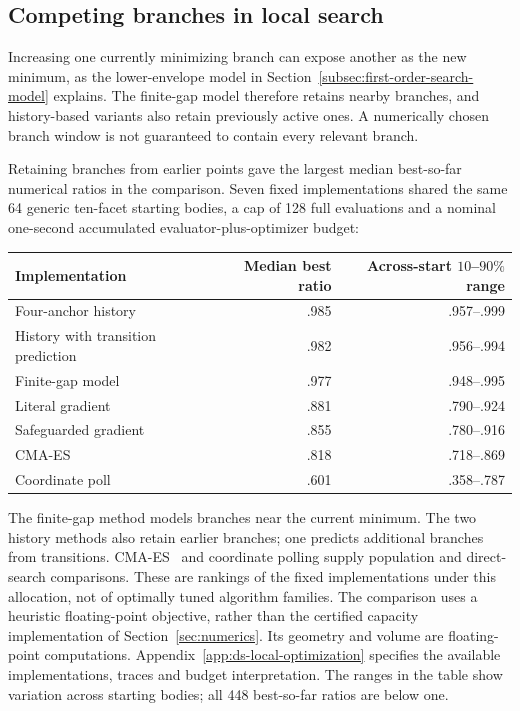 \subsection{Competing branches in local search}
\label{subsec:black-box-datascience-finite-budget-optimization}

Increasing one currently minimizing branch can expose another as the new
minimum, as the lower-envelope model in
Section~\ref{subsec:first-order-search-model} explains. The
finite-gap model therefore retains nearby branches, and history-based
variants also retain previously active ones. A numerically chosen branch
window is not guaranteed to contain every relevant branch.

Retaining branches from earlier points gave the largest median
best-so-far numerical ratios in the comparison. Seven fixed
implementations shared the same 64 generic ten-facet starting bodies, a cap
of 128 full evaluations and a nominal one-second accumulated
evaluator-plus-optimizer budget:
\begin{center}
\begin{tabular}{lrr}
\hline
Implementation & Median best ratio & Across-start $10$--$90\%$ range\\
\hline
Four-anchor history & .985 & .957--.999\\
History with transition prediction & .982 & .956--.994\\
Finite-gap model & .977 & .948--.995\\
Literal gradient & .881 & .790--.924\\
Safeguarded gradient & .855 & .780--.916\\
CMA-ES & .818 & .718--.869\\
Coordinate poll & .601 & .358--.787\\
\hline
\end{tabular}
\end{center}
The finite-gap method models branches near the current minimum. The two
history methods also retain earlier branches; one predicts additional
branches from transitions. CMA-ES~\cite{dsHansen2016} and coordinate polling
supply population and direct-search comparisons. These are rankings of
the fixed implementations under this allocation, not of optimally tuned
algorithm families. The comparison uses a heuristic floating-point objective,
rather than the certified capacity implementation of Section~\ref{sec:numerics}.
Its geometry and volume are floating-point computations. Appendix~\ref{app:ds-local-optimization} specifies the
available implementations, traces and budget interpretation. The ranges in the table
show variation across starting bodies; all 448 best-so-far ratios are below one.

